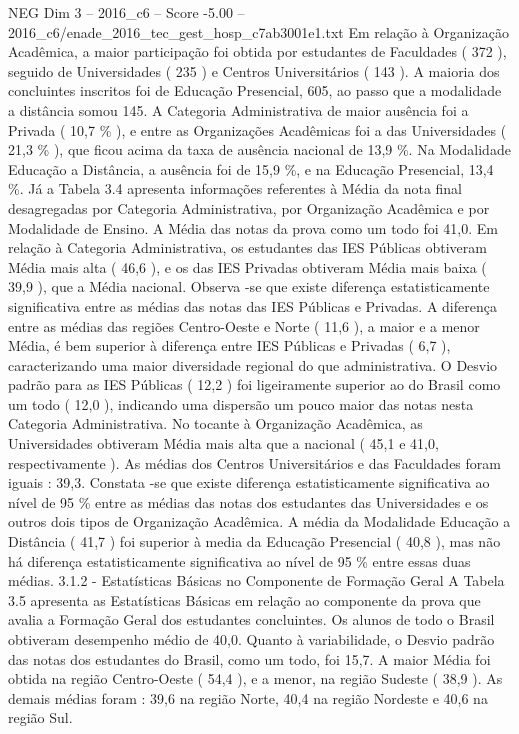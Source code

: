 \begin{textsample}{NEG Dim 3 – 2016\_c6 – Score -5.00 – 2016\_c6/enade\_2016\_tec\_gest\_hosp\_c7ab3001e1.txt}
Em relação à Organização Acadêmica, a maior participação foi obtida por estudantes de Faculdades ( 372 ), seguido de Universidades ( 235 ) e Centros Universitários ( 143 ).
A maioria dos concluintes inscritos foi de Educação Presencial, 605, ao passo que a modalidade a distância somou 145.
A Categoria Administrativa de maior ausência foi a Privada ( 10,7 \% ), e entre as Organizações Acadêmicas foi a das Universidades ( 21,3 \% ), que ficou acima da taxa de ausência nacional de 13,9 \%.
Na Modalidade Educação a Distância, a ausência foi de 15,9 \%, e na Educação Presencial, 13,4 \%.
Já a Tabela 3.4 apresenta informações referentes à Média da nota final desagregadas por Categoria Administrativa, por Organização Acadêmica e por Modalidade de Ensino.
A Média das notas da prova como um todo foi 41,0.
Em relação à Categoria Administrativa, os estudantes das IES Públicas obtiveram Média mais alta ( 46,6 ), e os das IES Privadas obtiveram Média mais baixa ( 39,9 ), que a Média nacional.
Observa -se que existe diferença estatisticamente significativa entre as médias das notas das IES Públicas e Privadas.
A diferença entre as médias das regiões Centro-Oeste e Norte ( 11,6 ), a maior e a menor Média, é bem superior à diferença entre IES Públicas e Privadas ( 6,7 ), caracterizando uma maior diversidade regional do que administrativa.
O Desvio padrão para as IES Públicas ( 12,2 ) foi ligeiramente superior ao do Brasil como um todo ( 12,0 ), indicando uma dispersão um pouco maior das notas nesta Categoria Administrativa.
No tocante à Organização Acadêmica, as Universidades obtiveram Média mais alta que a nacional ( 45,1 e 41,0, respectivamente ).
As médias dos Centros Universitários e das Faculdades foram iguais : 39,3.
Constata -se que existe diferença estatisticamente significativa ao nível de 95 \% entre as médias das notas dos estudantes das Universidades e os outros dois tipos de Organização Acadêmica.
A média da Modalidade Educação a Distância ( 41,7 ) foi superior à media da Educação Presencial ( 40,8 ), mas não há diferença estatisticamente significativa ao nível de 95 \% entre essas duas médias. 3.1.2 - Estatísticas Básicas no Componente de Formação Geral A Tabela 3.5 apresenta as Estatísticas Básicas em relação ao componente da prova que avalia a Formação Geral dos estudantes concluintes.
Os alunos de todo o Brasil obtiveram desempenho médio de 40,0.
Quanto à variabilidade, o Desvio padrão das notas dos estudantes do Brasil, como um todo, foi 15,7.
A maior Média foi obtida na região Centro-Oeste ( 54,4 ), e a menor, na região Sudeste ( 38,9 ).
As demais médias foram : 39,6 na região Norte, 40,4 na região Nordeste e 40,6 na região Sul.

\end{textsample}
